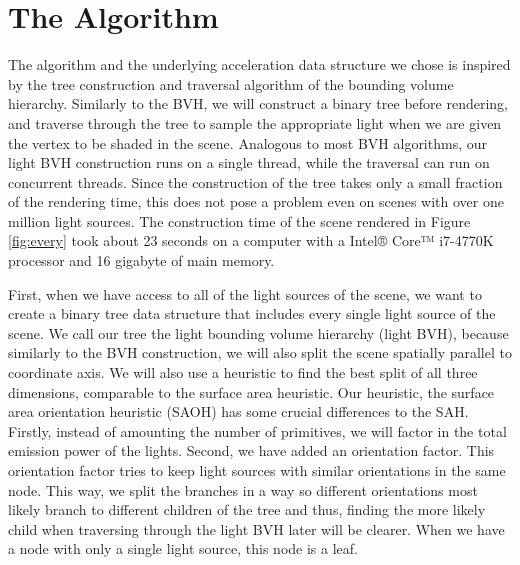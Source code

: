 
\chapter{The Algorithm}
\label{ch:alg}

The algorithm and the underlying acceleration data structure we chose is inspired by the tree construction and traversal algorithm of the bounding volume hierarchy. Similarly to the BVH, we will construct a binary tree before rendering, and traverse through the tree to sample the appropriate light when we are given the vertex to be shaded in the scene. Analogous to most BVH algorithms, our light BVH construction runs on a single thread, while the traversal can run on concurrent threads. Since the construction of the tree takes only a small fraction of the rendering time, this does not pose a problem even on scenes with over one million light sources. The construction time of the scene rendered in Figure \ref{fig:every} took about 23 seconds on a computer with a Intel® Core™ i7-4770K processor and 16 gigabyte of main memory.

First, when we have access to all of the light sources of the scene, we want to create a binary tree data structure that includes every single light source of the scene. We call our tree the light bounding volume hierarchy (light BVH), because similarly to the BVH construction, we will also split the scene spatially parallel to coordinate axis. We will also use a heuristic to find the best split of all three dimensions, comparable to the surface area heuristic. Our heuristic, the surface area orientation heuristic (SAOH) has some crucial differences to the SAH. Firstly, instead of amounting the number of primitives, we will factor in the total emission power of the lights. Second, we have added an orientation factor. This orientation factor tries to keep light sources with similar orientations in the same node. This way, we split the branches in a way so different orientations most likely branch to different children of the tree and thus, finding the more likely child when traversing through the light BVH later will be clearer. When we have a node with only a single light source, this node is a leaf.

